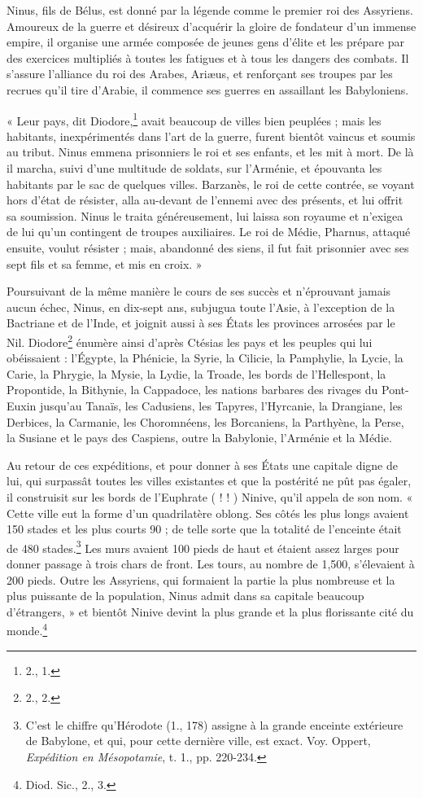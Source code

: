 \documentclass[a4paper, 11pt, oneside]{article}
\begin{document}
Ninus, fils de Bélus, est donné par la légende comme le premier roi des Assyriens. Amoureux de la guerre et désireux d'acquérir la gloire de fondateur d'un immense empire, il organise une armée composée de jeunes gens d'élite et les prépare par des exercices multipliés à toutes les fatigues et à tous les dangers des combats. Il s'assure l'alliance du roi des Arabes, Ariæus, et renforçant ses troupes par les recrues qu'il tire d'Arabie, il commence ses guerres en assaillant les Babyloniens.

« Leur pays, dit Diodore,\footnote{2., 1.} avait beaucoup de villes bien peuplées ; mais les habitants, inexpérimentés dans l'art de la guerre, furent bientôt vaincus et soumis au tribut. Ninus emmena prisonniers le roi et ses enfants, et les mit à mort. De là il marcha, suivi d'une multitude de soldats, sur l'Arménie, et épouvanta les habitants par le sac de quelques villes. Barzanès, le roi de cette contrée, se voyant hors d'état de résister, alla au-devant de l'ennemi avec des présents, et lui offrit sa soumission. Ninus le traita généreusement, lui laissa son royaume et n'exigea de lui qu'un contingent de troupes auxiliaires. Le roi de Médie, Pharnus, attaqué ensuite, voulut résister ; mais, abandonné des siens, il fut fait prisonnier avec ses sept fils et sa femme, et mis en croix. »

Poursuivant de la même manière le cours de ses succès et n'éprouvant jamais aucun échec, Ninus, en dix-sept ans, subjugua toute l'Asie, à l'exception de la Bactriane et de l'Inde, et joignit aussi à ses États les provinces arrosées par le Nil. Diodore\footnote{2., 2.} énumère ainsi d'après Ctésias les pays et les peuples qui lui obéissaient : l'Égypte, la Phénicie, la Syrie, la Cilicie, la Pamphylie, la Lycie, la Carie, la Phrygie, la Mysie, la Lydie, la Troade, les bords de l'Hellespont, la Propontide, la Bithynie, la Cappadoce, les nations barbares des rivages du Pont-Euxin jusqu'au Tanaïs, les Cadusiens, les Tapyres, l'Hyrcanie, la Drangiane, les Derbices, la Carmanie, les Choromnéens, les Borcaniens, la Parthyène, la Perse, la Susiane et le pays des Caspiens, outre la Babylonie, l'Arménie et la Médie.

Au retour de ces expéditions, et pour donner à ses États une capitale digne de lui, qui surpassât toutes les villes existantes et que la postérité ne pût pas égaler, il construisit sur les bords de l'Euphrate ( ! ! ) Ninive, qu'il appela de son nom. « Cette ville eut la forme d'un quadrilatère oblong. Ses côtés les plus longs avaient 150 stades et les plus courts 90 ; de telle sorte que la totalité de l'enceinte était de 480 stades.\footnote{C'est le chiffre qu'Hérodote (1., 178) assigne à la grande enceinte extérieure de Babylone, et qui, pour cette dernière ville, est exact. Voy. Oppert, \emph{Expédition en Mésopotamie}, t. 1., pp. 220-234.} Les murs avaient 100 pieds de haut et étaient assez larges pour donner passage à trois chars de front. Les tours, au nombre de 1,500, s'élevaient à 200 pieds. Outre les Assyriens, qui formaient la partie la plus nombreuse et la plus puissante de la population, Ninus admit dans sa capitale beaucoup d'étrangers, » et bientôt Ninive devint la plus grande et la plus florissante cité du monde.\footnote{Diod. Sic., 2., 3.}
\end{document}
